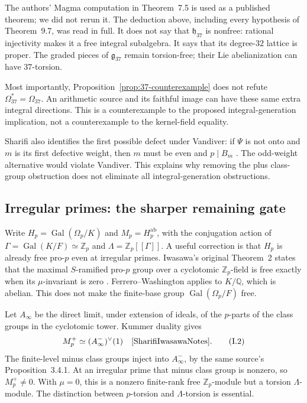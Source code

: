 \documentclass[11pt,a4paper]{article}
\theoremstyle{definition}
\begin{document}
The authors' Magma computation in Theorem~7.5 is used as a published theorem; we did not rerun it. The deduction above, including every hypothesis of Theorem~9.7, was read in full. It does not say that $\mathfrak h_{37}$ is nonfree: rational injectivity makes it a free integral subalgebra. It says that its degree-$32$ lattice is proper. The graded pieces of $\mathfrak g_{37}$ remain torsion-free; their Lie abelianization can have $37$-torsion.

Most importantly, Proposition~\ref{prop:37-counterexample} does not refute $\Omega_{37}^*=\Omega_{37}$. An arithmetic source and its faithful image can have these same extra integral directions. This is a counterexample to the proposed integral-generation implication, not a counterexample to the kernel-field equality.

Sharifi also identifies the first possible defect under Vandiver: if $\Psi$ is not onto and $m$ is its first defective weight, then $m$ must be even and $p\mid B_m$ \cite[Theorem~4.1, p.~10]{Sharifi2002}. The odd-weight alternative would violate Vandiver. This explains why removing the plus class-group obstruction does not eliminate all integral-generation obstructions.

\subsection{Irregular primes: the sharper remaining gate}
\label{sec:irregular-gate}

Write $H_p=\operatorname{Gal}(\Omega_p/K)$ and $M_p=H_p^{\mathrm{ab}}$, with the conjugation action of $\Gamma=\operatorname{Gal}(K/F)\simeq\mathbb Z_p$ and $\Lambda=\mathbb Z_p[[\Gamma]]$. A useful correction is that $H_p$ is already free pro-$p$ even at irregular primes. Iwasawa's original Theorem~2 states that the maximal $S$-ramified pro-$p$ group over a cyclotomic $\mathbb Z_p$-field is free exactly when its $\mu$-invariant is zero \cite[pp.~273--274]{Iwasawa1981}. Ferrero--Washington applies to $K/\mathbb Q$, which is abelian. This does not make the finite-base group $\operatorname{Gal}(\Omega_p/F)$ free.

Let $A_\infty$ be the direct limit, under extension of ideals, of the $p$-parts of the class groups in the cyclotomic tower. Kummer duality gives
\[
 M_p^+\simeq(A_\infty^-)^\vee(1)
 \quad\cite[Corollary~3.3.14 and Proposition~3.4.7]{SharifiIwasawaNotes}.
                                                               \tag{I.2}
\]
The finite-level minus class groups inject into $A_\infty^-$, by the same source's Proposition~3.4.1. At an irregular prime that minus class group is nonzero, so $M_p^+\neq0$. With $\mu=0$, this is a nonzero finite-rank free $\mathbb Z_p$-module but a torsion $\Lambda$-module. The distinction between $p$-torsion and $\Lambda$-torsion is essential.
\end{document}
